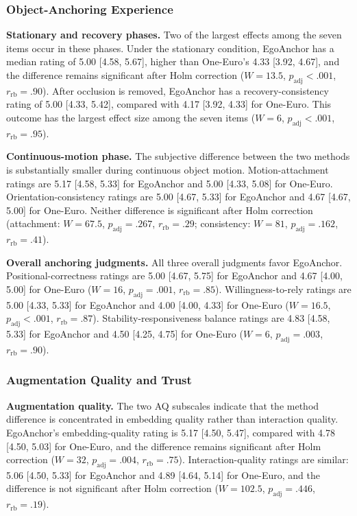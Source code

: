 \documentclass[review]{vgtc}
\begin{document}
\subsubsection{Object-Anchoring Experience}

\textbf{Stationary and recovery phases.}
Two of the largest effects among the seven items occur in these phases. Under the stationary condition, EgoAnchor has a median rating of 5.00 [4.58, 5.67], higher than One-Euro's 4.33 [3.92, 4.67], and the difference remains significant after Holm correction ($W=13.5$, $p_{\mathrm{adj}}<.001$, $r_{\mathrm{rb}}=.90$). After occlusion is removed, EgoAnchor has a recovery-consistency rating of 5.00 [4.33, 5.42], compared with 4.17 [3.92, 4.33] for One-Euro. This outcome has the largest effect size among the seven items ($W=6$, $p_{\mathrm{adj}}<.001$, $r_{\mathrm{rb}}=.95$).

\textbf{Continuous-motion phase.}
The subjective difference between the two methods is substantially smaller during continuous object motion. Motion-attachment ratings are 5.17 [4.58, 5.33] for EgoAnchor and 5.00 [4.33, 5.08] for One-Euro. Orientation-consistency ratings are 5.00 [4.67, 5.33] for EgoAnchor and 4.67 [4.67, 5.00] for One-Euro. Neither difference is significant after Holm correction (attachment: $W=67.5$, $p_{\mathrm{adj}}=.267$, $r_{\mathrm{rb}}=.29$; consistency: $W=81$, $p_{\mathrm{adj}}=.162$, $r_{\mathrm{rb}}=.41$).

\textbf{Overall anchoring judgments.}
All three overall judgments favor EgoAnchor. Positional-correctness ratings are 5.00 [4.67, 5.75] for EgoAnchor and 4.67 [4.00, 5.00] for One-Euro ($W=16$, $p_{\mathrm{adj}}=.001$, $r_{\mathrm{rb}}=.85$). Willingness-to-rely ratings are 5.00 [4.33, 5.33] for EgoAnchor and 4.00 [4.00, 4.33] for One-Euro ($W=16.5$, $p_{\mathrm{adj}}<.001$, $r_{\mathrm{rb}}=.87$). Stability-responsiveness balance ratings are 4.83 [4.58, 5.33] for EgoAnchor and 4.50 [4.25, 4.75] for One-Euro ($W=6$, $p_{\mathrm{adj}}=.003$, $r_{\mathrm{rb}}=.90$).

\subsubsection{Augmentation Quality and Trust}

\textbf{Augmentation quality.}
The two AQ subscales indicate that the method difference is concentrated in embedding quality rather than interaction quality. EgoAnchor's embedding-quality rating is 5.17 [4.50, 5.47], compared with 4.78 [4.50, 5.03] for One-Euro, and the difference remains significant after Holm correction ($W=32$, $p_{\mathrm{adj}}=.004$, $r_{\mathrm{rb}}=.75$). Interaction-quality ratings are similar: 5.06 [4.50, 5.33] for EgoAnchor and 4.89 [4.64, 5.14] for One-Euro, and the difference is not significant after Holm correction ($W=102.5$, $p_{\mathrm{adj}}=.446$, $r_{\mathrm{rb}}=.19$).
\end{document}
